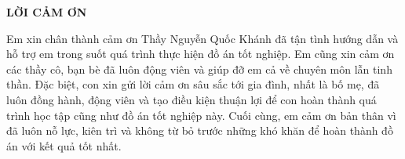 \documentclass[../DoAn.tex]{subfiles}
\begin{document}
\begin{center}
    \Large{\textbf{LỜI CẢM ƠN}}\\
\end{center}
\vspace{1cm}
Em xin chân thành cảm ơn Thầy Nguyễn Quốc Khánh đã tận tình hướng dẫn và hỗ trợ em trong suốt quá trình thực hiện đồ án tốt nghiệp. Em cũng xin cảm ơn các thầy cô, bạn bè đã luôn động viên và giúp đỡ em cả về chuyên môn lẫn tinh thần. Đặc biệt, con xin gửi lời cảm ơn sâu sắc tới gia đình, nhất là bố mẹ, đã luôn đồng hành, động viên và tạo điều kiện thuận lợi để con hoàn thành quá trình học tập cũng như đồ án tốt nghiệp này. Cuối cùng, em cảm ơn bản thân vì đã luôn nỗ lực, kiên trì và không từ bỏ trước những khó khăn để hoàn thành đồ án với kết quả tốt nhất.
\end{document}
